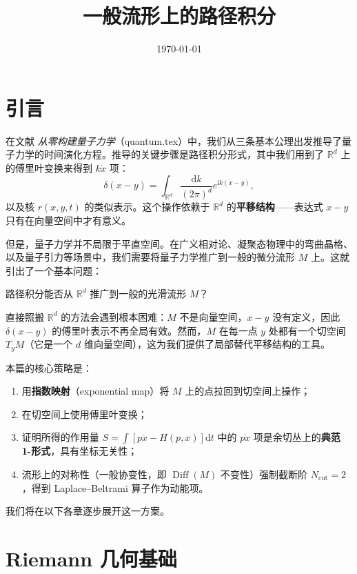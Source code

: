 \documentclass{book}
\newcommand{\mathd}{\mathrm{d}}
\newcommand{\mathi}{\mathrm{i}}
\newcommand{\mathpi}{\pi}
\begin{document}
\title{一般流形上的路径积分}
\author{}
\date{\today}

\maketitle

\chapter{引言}

在文献 \emph{从零构建量子力学}（quantum.tex）中，我们从三条基本公理出发推导了量子力学的时间演化方程。推导的关键步骤是路径积分形式，其中我们用到了 $\mathbb{R}^d$ 上的傅里叶变换来得到 $k\dot{x}$ 项：
\[
\delta(x-y) = \int_{\mathbb{R}^d} \frac{\mathd k}{(2\mathpi)^d} e^{\mathi k (x-y)},
\]
以及核 $r(x,y,t)$ 的类似表示。这个操作依赖于 $\mathbb{R}^d$ 的\textbf{平移结构}——表达式 $x-y$ 只有在向量空间中才有意义。

但是，量子力学并不局限于平直空间。在广义相对论、凝聚态物理中的弯曲晶格、以及量子引力等场景中，我们需要将量子力学推广到一般的微分流形 $M$ 上。这就引出了一个基本问题：

\begin{em}
  路径积分能否从 $\mathbb{R}^d$ 推广到一般的光滑流形 $M$？
\end{em}

直接照搬 $\mathbb{R}^d$ 的方法会遇到根本困难：$M$ 不是向量空间，$x-y$ 没有定义，因此 $\delta(x-y)$ 的傅里叶表示不再全局有效。然而，$M$ 在每一点 $y$ 处都有一个切空间 $T_yM$（它是一个 $d$ 维向量空间），这为我们提供了局部替代平移结构的工具。

本篇的核心策略是：

\begin{enumerate}
  \item 用\textbf{指数映射}（exponential map）将 $M$ 上的点拉回到切空间上操作；
  \item 在切空间上使用傅里叶变换；
  \item 证明所得的作用量 $S = \int [p\dot{x} - H(p,x)]\mathd t$ 中的 $p\dot{x}$ 项是余切丛上的\textbf{典范 1-形式}，具有坐标无关性；
  \item 流形上的对称性（一般协变性，即 $\operatorname{Diff}(M)$ 不变性）强制截断阶 $N_{\mathrm{cut}} = 2$，得到 Laplace--Beltrami 算子作为动能项。
\end{enumerate}

我们将在以下各章逐步展开这一方案。

\chapter{Riemann 几何基础}
\end{document}
